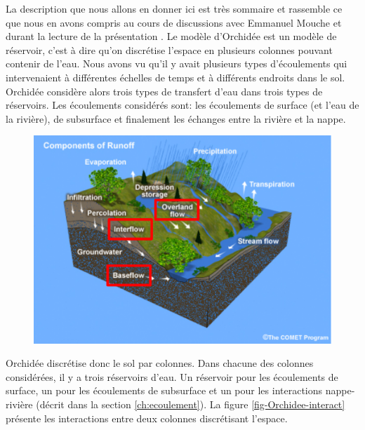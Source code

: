 \documentclass[a4paper,11pt]{article}
\numberwithin{equation}{section}
\begin{document}
La description que nous allons en donner ici est très sommaire et rassemble ce que nous en avons compris au cours de discussions avec Emmanuel Mouche et durant la lecture de la présentation \cite{gumiberteau2016}. Le modèle d'Orchidée est un modèle de réservoir, c'est à dire qu'on discrétise l'espace en plusieurs colonnes pouvant contenir de l'eau. Nous avons vu qu'il y avait plusieurs types d'écoulements qui intervenaient à différentes échelles de temps et à différents endroits dans le sol. Orchidée considère alors trois types de transfert d'eau dans trois types de réservoirs. Les écoulements considérés sont: les écoulements de surface (et l'eau de la rivière), de subsurface et finalement les échanges entre la rivière et la nappe. 

\begin{figure}[H]
	\label{fig-HGS}
	\begin{center}
		\includegraphics[scale=0.3]{different_flows.png}
	\end{center}
\end{figure}

Orchidée discrétise donc le sol par colonnes. Dans chacune des colonnes considérées, il y a trois réservoirs d'eau. Un réservoir pour les écoulements de surface, un pour les écoulements de subsurface et un pour les interactions nappe-rivière (décrit dans la section \ref{ch:ecoulement}). La figure \ref{fig-Orchidee-interact} présente les interactions entre deux colonnes discrétisant l'espace.
\end{document}
